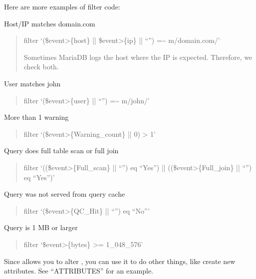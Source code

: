 \documentclass[letterpaper,10pt,english]{sphinxmanual}
\begin{document}
\begin{fulllineitems}
\sphinxAtStartPar
Here are more examples of filter code:

\sphinxAtStartPar
Host/IP matches domain.com
\begin{quote}

\sphinxAtStartPar
\textendash{}filter ‘(\$event\sphinxhyphen{}\textgreater{}\{host\} || \$event\sphinxhyphen{}\textgreater{}\{ip\} || “”) =\textasciitilde{} m/domain.com/’

\sphinxAtStartPar
Sometimes MariaDB logs the host where the IP is expected.  Therefore, we
check both.
\end{quote}

\sphinxAtStartPar
User matches john
\begin{quote}

\sphinxAtStartPar
\textendash{}filter ‘(\$event\sphinxhyphen{}\textgreater{}\{user\} || “”) =\textasciitilde{} m/john/’
\end{quote}

\sphinxAtStartPar
More than 1 warning
\begin{quote}

\sphinxAtStartPar
\textendash{}filter ‘(\$event\sphinxhyphen{}\textgreater{}\{Warning\_count\} || 0) \textgreater{} 1’
\end{quote}

\sphinxAtStartPar
Query does full table scan or full join
\begin{quote}

\sphinxAtStartPar
\textendash{}filter ‘((\$event\sphinxhyphen{}\textgreater{}\{Full\_scan\} || “”) eq “Yes”) || ((\$event\sphinxhyphen{}\textgreater{}\{Full\_join\} || “”) eq “Yes”)’
\end{quote}

\sphinxAtStartPar
Query was not served from query cache
\begin{quote}

\sphinxAtStartPar
\textendash{}filter ‘(\$event\sphinxhyphen{}\textgreater{}\{QC\_Hit\} || “”) eq “No”’
\end{quote}

\sphinxAtStartPar
Query is 1 MB or larger
\begin{quote}

\sphinxAtStartPar
\textendash{}filter ‘\$event\sphinxhyphen{}\textgreater{}\{bytes\} \textgreater{}= 1\_048\_576’
\end{quote}

\sphinxAtStartPar
Since {\hyperref[\detokenize{mariadb-query-digest:cmdoption-mariadb-query-digest-filter}]{}} allows you to alter , you can use it to do other
things, like create new attributes.  See “ATTRIBUTES” for an example.

\end{fulllineitems}
\end{document}
